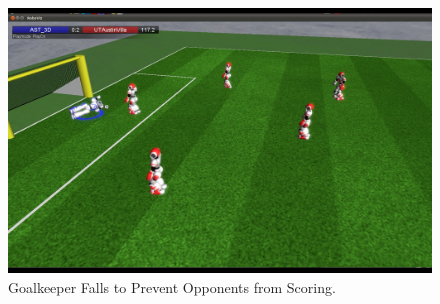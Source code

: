 \begin{figure}[t!]
	\includegraphics[trim = 5cm 10cm 30cm 5cm, clip,scale=0.25]{Chapter3/figures/GoalieFall4.png}
	\caption{Goalkeeper Falls to Prevent Opponents from Scoring.}
  \label{fig:GoalkeeperFall}
\end{figure}